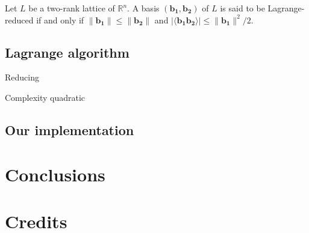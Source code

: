 \documentclass[10pt, a4paper]{article}
\renewcommand{\vec}[1]{\mathbf{#1}}
\begin{document}
Let $L$ be a two-rank lattice of $\mathbb{R}^n$. A basis $(\vec{b_1}, \vec{b_2})$ of $L$ is said to be Lagrange-reduced if and only if $\|\vec{b_1}\| \leq \|\vec{b_2}\|$ and $| \langle \vec{b_1} \vec{b_2} \rangle | \leq \| \vec{b_1} \|^2 / 2 $. 

\subsection{Lagrange algorithm}

Reducing 

Complexity quadratic

\subsection{Our implementation}

\section{Conclusions}




\section{Credits}
\end{document}
